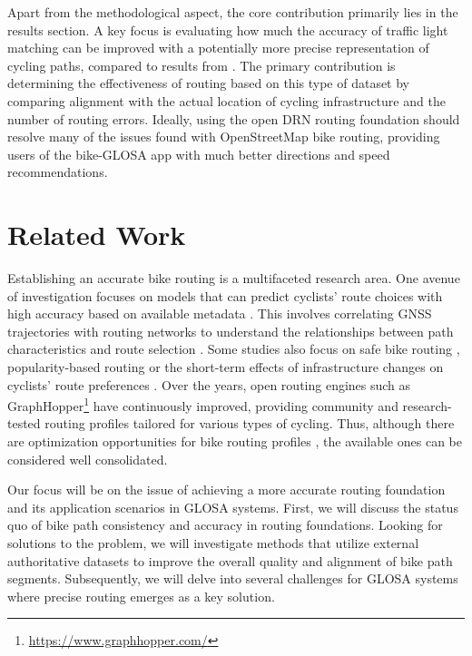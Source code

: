 Apart from the methodological aspect, the core contribution primarily lies in the results section. A key focus is evaluating how much the accuracy of traffic light matching can be improved with a potentially more precise representation of cycling paths, compared to results from . The primary contribution is determining the effectiveness of routing based on this type of dataset by comparing alignment with the actual location of cycling infrastructure and the number of routing errors. Ideally, using the open DRN routing foundation should resolve many of the issues found with OpenStreetMap bike routing, providing users of the bike-GLOSA app with much better directions and speed recommendations.

\section{Related Work}\label{sec:rw-uis}

Establishing an accurate bike routing is a multifaceted research area. One avenue of investigation focuses on models that can predict cyclists' route choices with high accuracy based on available metadata \cite{dill_understanding_2008, ghanayim_modelling_2018, huber_modelling_2021}. This involves correlating GNSS trajectories with routing networks to understand the relationships between path characteristics and route selection \cite{sultan_extracting_2017, huber_modelling_2021}. Some studies also focus on safe bike routing \cite{loidl_online_2018}, popularity-based routing \cite{bergman_conflation_2016} or the short-term effects of infrastructure changes on cyclists' route preferences \cite{yeboah_route_2015, pritchard_does_2019}. Over the years, open routing engines such as GraphHopper\footnote{\url{https://www.graphhopper.com/}} have continuously improved, providing community and research-tested routing profiles tailored for various types of cycling. Thus, although there are optimization opportunities for bike routing profiles \cite{krismer_elevation_2016}, the available ones can be considered well consolidated.

Our focus will be on the issue of achieving a more accurate routing foundation and its application scenarios in GLOSA systems. First, we will discuss the status quo of bike path consistency and accuracy in routing foundations. Looking for solutions to the problem, we will investigate methods that utilize external authoritative datasets to improve the overall quality and alignment of bike path segments. Subsequently, we will delve into several challenges for GLOSA systems where precise routing emerges as a key solution.

